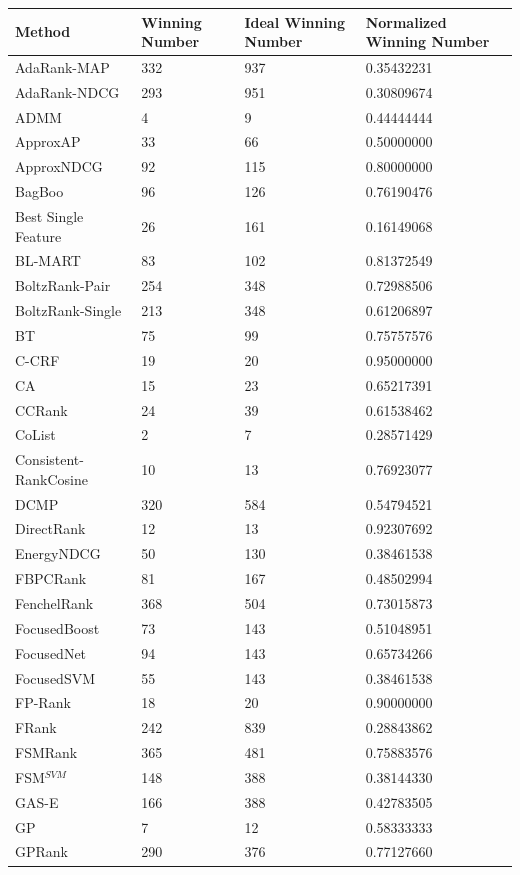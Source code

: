 \documentclass{sig-alternate-2013}
\begin{document}
\begin{longtable}{p{3.2cm}|p{1.3cm}|p{1.3cm}|p{1.4cm}}
Method & Winning Number & Ideal Winning Number & Normalized Winning Number \\
\hline
AdaRank-MAP & 332 & 937 & 0.35432231 \\ 
AdaRank-NDCG & 293 & 951 & 0.30809674 \\ 
ADMM & 4 & 9 & 0.44444444 \\ 
ApproxAP & 33 & 66 & 0.50000000 \\ 
ApproxNDCG & 92 & 115 & 0.80000000 \\ 
BagBoo & 96 & 126 & 0.76190476 \\ 
Best Single Feature & 26 & 161 & 0.16149068 \\ 
BL-MART & 83 & 102 & 0.81372549 \\ 
BoltzRank-Pair & 254 & 348 & 0.72988506 \\ 
BoltzRank-Single & 213 & 348 & 0.61206897 \\ 
BT & 75 & 99 & 0.75757576 \\ 
C-CRF & 19 & 20 & 0.95000000 \\ 
CA & 15 & 23 & 0.65217391 \\ 
CCRank & 24 & 39 & 0.61538462 \\ 
CoList & 2 & 7 & 0.28571429 \\ 
Consistent-RankCosine & 10 & 13 & 0.76923077 \\ 
DCMP & 320 & 584 & 0.54794521 \\ 
DirectRank & 12 & 13 & 0.92307692 \\ 
EnergyNDCG & 50 & 130 & 0.38461538 \\ 
FBPCRank & 81 & 167 & 0.48502994 \\ 
FenchelRank & 368 & 504 & 0.73015873 \\ 
FocusedBoost & 73 & 143 & 0.51048951 \\ 
FocusedNet & 94 & 143 & 0.65734266 \\ 
FocusedSVM & 55 & 143 & 0.38461538 \\ 
FP-Rank & 18 & 20 & 0.90000000 \\ 
FRank & 242 & 839 & 0.28843862 \\ 
FSMRank & 365 & 481 & 0.75883576 \\ 
FSM$^{SVM}$ & 148 & 388 & 0.38144330 \\ 
GAS-E & 166 & 388 & 0.42783505 \\ 
GP & 7 & 12 & 0.58333333 \\ 
GPRank & 290 & 376 & 0.77127660 \\ 

\end{longtable}
\end{document}
